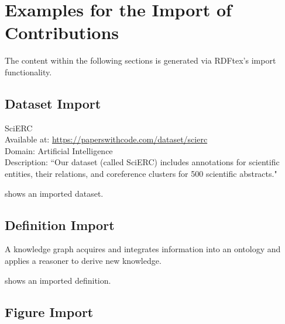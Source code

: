 
\section{Examples for the Import of Contributions}

The content within the following sections is generated via RDFtex's import functionality.

\subsection{Dataset Import}

 \begin{dataset}
 SciERC~\cite{DBLP:conf/emnlp/LuanHOH18}\\
 Available at: \url{https://paperswithcode.com/dataset/scierc}\\
 Domain: Artificial Intelligence\\
 Description: ``Our dataset (called SciERC) includes annotations for scientific entities, their relations, and coreference clusters for 500 scientific abstracts."~\cite{DBLP:conf/emnlp/LuanHOH18}
 \label{dataset:scierc}
 \end{dataset}
 shows an imported dataset.

\subsection{Definition Import}

 \begin{definition}
 \label{def:knowledge-graph}
 A knowledge graph acquires and integrates information into an ontology and applies a reasoner to derive new knowledge.
 \end{definition}
 shows an imported definition.

\subsection{Figure Import}

